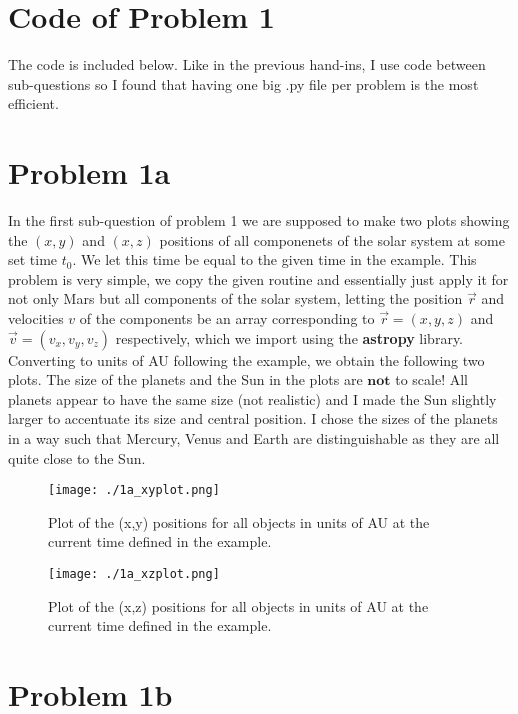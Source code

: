 \section*{Code of Problem 1}

The code is included below. Like in the previous hand-ins, I use code between sub-questions so I found that having one big .py file per problem is the most efficient.


\section*{Problem 1a}

In the first sub-question of problem 1 we are supposed to make two plots showing the $(x,y)$ and $(x,z)$ positions of all componenets of the solar system at some set time $t_0$. We let this time be equal to the given time in the example. This problem is very simple, we copy the given routine and essentially just apply it for not only Mars but all components of the solar system, letting the position $\vec{r}$ and velocities ${v}$ of the components be an array corresponding to $\vec{r} = (x,y,z)$ and $\vec{v} = (v_x,v_y,v_z)$ respectively, which we import using the \textbf{astropy} library. Converting to units of AU following the example, we obtain the following two plots. The size of the planets and the Sun in the plots are $\textbf{not}$ to scale! All planets appear to have the same size (not realistic) and I made the Sun slightly larger to accentuate its size and central position. I chose the sizes of the planets in a way such that Mercury, Venus and Earth are distinguishable as they are all quite close to the Sun. 

\begin{figure}[h!]
  \centering
  \texttt{[image: ./1a\_xyplot.png]}
  \caption{Plot of the (x,y) positions for all objects in units of AU at the current time defined in the example.}
\end{figure}

\begin{figure}[h!]
  \centering
  \texttt{[image: ./1a\_xzplot.png]}
  \caption{Plot of the (x,z) positions for all objects in units of AU at the current time defined in the example.}
\end{figure}

\section*{Problem 1b}

